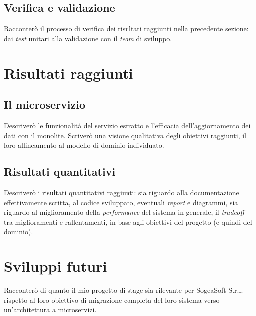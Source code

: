         \subsection{Verifica e validazione}
        Racconterò il processo di verifica dei risultati raggiunti nella precedente sezione: dai \textit{test} unitari alla validazione con il \textit{team} di sviluppo.
    \section{Risultati raggiunti}
        \subsection{Il microservizio}
        Descriverò le funzionalità del servizio estratto e l'efficacia dell'aggiornamento dei dati con il monolite.
        Scriverò una visione qualitativa degli obiettivi raggiunti, il loro allineamento al modello di dominio individuato.
        \subsection{Risultati quantitativi}
        Descriverò i risultati quantitativi raggiunti: sia riguardo alla documentazione effettivamente scritta, al codice sviluppato, eventuali \textit{report} e diagrammi, sia riguardo al miglioramento della \textit{performance} del sistema in generale, il \textit{tradeoff} tra miglioramenti e rallentamenti, in base agli obiettivi del progetto (e quindi del dominio).
    \section{Sviluppi futuri}
    Racconterò di quanto il mio progetto di stage sia rilevante per SogeaSoft S.r.l. rispetto al loro obiettivo di migrazione completa del loro sistema verso un'architettura a microservizi.

    
    